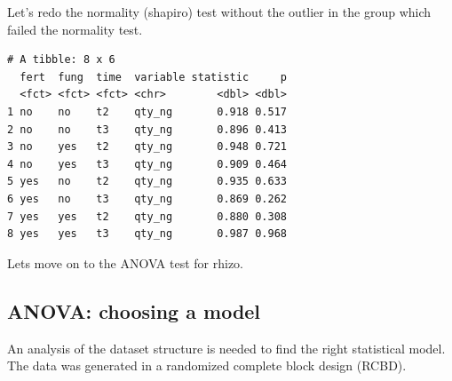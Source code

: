 \documentclass[twoside,12pt,final]{ucthesis-CA2012}
\newenvironment{Shaded}{}{}
\newcommand{\KeywordTok}[1]{\textcolor[rgb]{0.00,0.44,0.13}{\textbf{{#1}}}}
\newcommand{\StringTok}[1]{\textcolor[rgb]{0.25,0.44,0.63}{{#1}}}
\newcommand{\CommentTok}[1]{\textcolor[rgb]{0.38,0.63,0.69}{\textit{{#1}}}}
\newcommand{\NormalTok}[1]{{#1}}
\newcommand{\OperatorTok}[1]{\textcolor[rgb]{0.00,0.44,0.13}{\textbf{{#1}}}}
\begin{document}
\begin{ucmainmatter}
Let's redo the normality (shapiro) test without the outlier in the group which failed the normality test.
\begin{Shaded}
\end{Shaded}
\begin{verbatim}
# A tibble: 8 x 6
  fert  fung  time  variable statistic     p
  <fct> <fct> <fct> <chr>        <dbl> <dbl>
1 no    no    t2    qty_ng       0.918 0.517
2 no    no    t3    qty_ng       0.896 0.413
3 no    yes   t2    qty_ng       0.948 0.721
4 no    yes   t3    qty_ng       0.909 0.464
5 yes   no    t2    qty_ng       0.935 0.633
6 yes   no    t3    qty_ng       0.869 0.262
7 yes   yes   t2    qty_ng       0.880 0.308
8 yes   yes   t3    qty_ng       0.987 0.968
\end{verbatim}
\begin{Shaded}
\end{Shaded}
Lets move on to the ANOVA test for rhizo.

\hypertarget{anova-choosing-a-model}{%
\subsection{ANOVA: choosing a model}\label{anova-choosing-a-model}}

An analysis of the dataset structure is needed to find the right statistical model. The data was generated in a randomized complete block design (RCBD).


\end{ucmainmatter}
\end{document}

